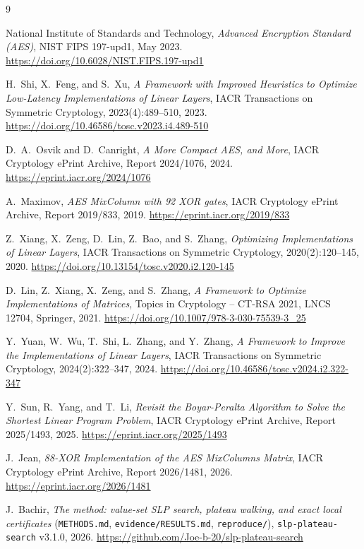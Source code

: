 \documentclass[11pt,a4paper]{article}
\begin{document}
\begin{thebibliography}{9}

National Institute of Standards and Technology,
\emph{Advanced Encryption Standard (AES)},
NIST FIPS 197-upd1, May 2023.
\url{https://doi.org/10.6028/NIST.FIPS.197-upd1}

H.~Shi, X.~Feng, and S.~Xu,
\emph{A Framework with Improved Heuristics to Optimize Low-Latency
Implementations of Linear Layers},
IACR Transactions on Symmetric Cryptology, 2023(4):489--510, 2023.
\url{https://doi.org/10.46586/tosc.v2023.i4.489-510}

D.~A.~Osvik and D.~Canright,
\emph{A More Compact AES, and More},
IACR Cryptology ePrint Archive, Report 2024/1076, 2024.
\url{https://eprint.iacr.org/2024/1076}

A.~Maximov,
\emph{AES MixColumn with 92 XOR gates},
IACR Cryptology ePrint Archive, Report 2019/833, 2019.
\url{https://eprint.iacr.org/2019/833}

Z.~Xiang, X.~Zeng, D.~Lin, Z.~Bao, and S.~Zhang,
\emph{Optimizing Implementations of Linear Layers},
IACR Transactions on Symmetric Cryptology, 2020(2):120--145, 2020.
\url{https://doi.org/10.13154/tosc.v2020.i2.120-145}

D.~Lin, Z.~Xiang, X.~Zeng, and S.~Zhang,
\emph{A Framework to Optimize Implementations of Matrices},
Topics in Cryptology -- CT-RSA 2021, LNCS 12704, Springer, 2021.
\url{https://doi.org/10.1007/978-3-030-75539-3_25}

Y.~Yuan, W.~Wu, T.~Shi, L.~Zhang, and Y.~Zhang,
\emph{A Framework to Improve the Implementations of Linear Layers},
IACR Transactions on Symmetric Cryptology, 2024(2):322--347, 2024.
\url{https://doi.org/10.46586/tosc.v2024.i2.322-347}

Y.~Sun, R.~Yang, and T.~Li,
\emph{Revisit the Boyar-Peralta Algorithm to Solve the Shortest Linear
Program Problem},
IACR Cryptology ePrint Archive, Report 2025/1493, 2025.
\url{https://eprint.iacr.org/2025/1493}

J.~Jean,
\emph{88-XOR Implementation of the AES MixColumns Matrix},
IACR Cryptology ePrint Archive, Report 2026/1481, 2026.
\url{https://eprint.iacr.org/2026/1481}

J.~Bachir,
\emph{The method: value-set SLP search, plateau walking, and exact local
certificates} (\texttt{METHODS.md}, \texttt{evidence/RESULTS.md},
\texttt{reproduce/}), \texttt{slp-plateau-search} v3.1.0, 2026.
\url{https://github.com/Joe-b-20/slp-plateau-search}

\end{thebibliography}

\appendix

\end{document}
